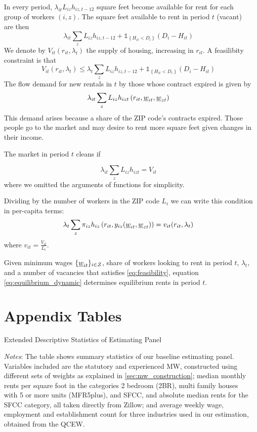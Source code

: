 In every period, $\lambda_{it} L_{iz} h_{iz,t-12}$ square feet become available for 
rent for each group of workers $(i,z)$.
The square feet available to rent in period $t$ (vacant) are then
$$
\lambda_{it} \sum_z L_{iz} h_{iz,t-12} + \mathds{1}_{\left\{H_{it} < D_i\right\}} (D_i - 
H_{it})
$$
We denote by $V_{it}(r_{it}, \lambda_t)$ the supply of housing, increasing in $r_{it}$. 
A feasilibity constraint is that 
\begin{equation}\label{eq:feasibility}
	V_{it}(r_{it}, \lambda_t) \leq \lambda_t \sum_z L_{iz} h_{iz,t-12} + 
	\mathds{1}_{\left\{H_{it} < D_i\right\}} (D_i - H_{it})
\end{equation}
The flow demand for new rentals in $t$ by those whose contract expired is given by
$$
\lambda_{it} \sum_z L_{iz} h_{izt} \left(r_{it}, \underline{w}_{it}, \underline{w}_{zt} \right)
$$
This demand arises because a share of the ZIP code's contracts expired. Those people
go to the market and may desire to rent more square feet given changes in their income.

The market in period $t$ cleans if

$$
\lambda_{it} \sum_z L_{iz} h_{izt} = V_{it}
$$
where we omitted the arguments of functions for simplicity.

Dividing by the number of workers in the ZIP code $L_i$ we can write this condition in 
per-capita terms:
\begin{equation}\label{eq:equilibrium_dynamic}
	\lambda_t \sum_z \pi_{iz} h_{iz} \left(r_{it}, y_{iz} (\underline{w}_{it}, \underline{w}_{zt}) \right) = 
	v_{it}(r_{it}, \lambda_t)
\end{equation}
where $v_{it} = \frac{V_{it}}{L_{i}}$.

Given minimum wages $\{\underline{w}_{it}\}_{i\in\mathcal{Z}}$, share of workers looking to rent in period 
$t$, $\lambda_t$, and a number of vacancies that satisfies \eqref{eq:feasibility},
equation \eqref{eq:equilibrium_dynamic} determines equilibrium rents in period $t$.

\section{Appendix Tables}

\begin{table}[h!]
	\caption{Extended Descriptive Statistics of Estimating Panel}
	\label{tab:estimating_panel_stats_long}
	\centering
	
	\begin{minipage}{0.95\textwidth} \footnotesize
		\vspace{3mm} 
		\textit{Notes}: The table shows summary statistics of our baseline estimating panel.
		Variables included are the statutory and experienced MW, constructed using different
		sets of weights as explained in \autoref{sec:mw_construction}; median monthly rents 
		per square foot in the categories 2 bedroom (2BR), multi family houses with 5 or more 
		units (MFR5plus), and SFCC, and absolute median rents for the SFCC category, all taken
		directly from Zillow; and average weekly wage, employment and establishment count 
		for three industries used in our estimation, obtained from the QCEW.
	\end{minipage}
\end{table}

